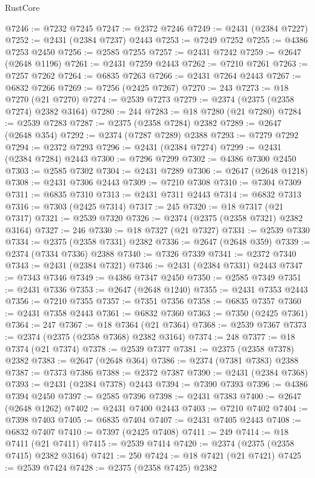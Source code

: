 \begin{lexlean}{RustCore}
\begin{coremodule}
@7246 := @7232 @7245
@7247 := @2372 @7246
@7249 := @2431 (@2384 @7227)
@7252 := @2431 (@2384 @7237) @2443
@7253 := @7249 @7252
@7255 := @4386 @7253 @2450
@7256 := @2585 @7255
@7257 := @2431 @7242
@7259 := @2647 (@2648 @1196)
@7261 := @2431 @7259 @2443
@7262 := @7210 @7261
@7263 := @7257 @7262
@7264 := @6835 @7263
@7266 := @2431 @7264 @2443
@7267 := @6832 @7266
@7269 := @7256 (@2425 @7267)
@7270 := 243
@7273 := @18 @7270 (@21 @7270)
@7274 := @2539 @7273
@7279 := @2374 (@2375 (@2358 @7274) @2382 @3164)
@7280 := 244
@7283 := @18 @7280 (@21 @7280)
@7284 := @2539 @7283
@7287 := @2375 (@2358 @7284) @2382
@7289 := @2647 (@2648 @354)
@7292 := @2374 (@7287 @7289) @2388
@7293 := @7279 @7292
@7294 := @2372 @7293
@7296 := @2431 (@2384 @7274)
@7299 := @2431 (@2384 @7284) @2443
@7300 := @7296 @7299
@7302 := @4386 @7300 @2450
@7303 := @2585 @7302
@7304 := @2431 @7289
@7306 := @2647 (@2648 @1218)
@7308 := @2431 @7306 @2443
@7309 := @7210 @7308
@7310 := @7304 @7309
@7311 := @6835 @7310
@7313 := @2431 @7311 @2443
@7314 := @6832 @7313
@7316 := @7303 (@2425 @7314)
@7317 := 245
@7320 := @18 @7317 (@21 @7317)
@7321 := @2539 @7320
@7326 := @2374 (@2375 (@2358 @7321) @2382 @3164)
@7327 := 246
@7330 := @18 @7327 (@21 @7327)
@7331 := @2539 @7330
@7334 := @2375 (@2358 @7331) @2382
@7336 := @2647 (@2648 @359)
@7339 := @2374 (@7334 @7336) @2388
@7340 := @7326 @7339
@7341 := @2372 @7340
@7343 := @2431 (@2384 @7321)
@7346 := @2431 (@2384 @7331) @2443
@7347 := @7343 @7346
@7349 := @4386 @7347 @2450
@7350 := @2585 @7349
@7351 := @2431 @7336
@7353 := @2647 (@2648 @1240)
@7355 := @2431 @7353 @2443
@7356 := @7210 @7355
@7357 := @7351 @7356
@7358 := @6835 @7357
@7360 := @2431 @7358 @2443
@7361 := @6832 @7360
@7363 := @7350 (@2425 @7361)
@7364 := 247
@7367 := @18 @7364 (@21 @7364)
@7368 := @2539 @7367
@7373 := @2374 (@2375 (@2358 @7368) @2382 @3164)
@7374 := 248
@7377 := @18 @7374 (@21 @7374)
@7378 := @2539 @7377
@7381 := @2375 (@2358 @7378) @2382
@7383 := @2647 (@2648 @364)
@7386 := @2374 (@7381 @7383) @2388
@7387 := @7373 @7386
@7388 := @2372 @7387
@7390 := @2431 (@2384 @7368)
@7393 := @2431 (@2384 @7378) @2443
@7394 := @7390 @7393
@7396 := @4386 @7394 @2450
@7397 := @2585 @7396
@7398 := @2431 @7383
@7400 := @2647 (@2648 @1262)
@7402 := @2431 @7400 @2443
@7403 := @7210 @7402
@7404 := @7398 @7403
@7405 := @6835 @7404
@7407 := @2431 @7405 @2443
@7408 := @6832 @7407
@7410 := @7397 (@2425 @7408)
@7411 := 249
@7414 := @18 @7411 (@21 @7411)
@7415 := @2539 @7414
@7420 := @2374 (@2375 (@2358 @7415) @2382 @3164)
@7421 := 250
@7424 := @18 @7421 (@21 @7421)
@7425 := @2539 @7424
@7428 := @2375 (@2358 @7425) @2382

\end{coremodule}
\end{lexlean}
